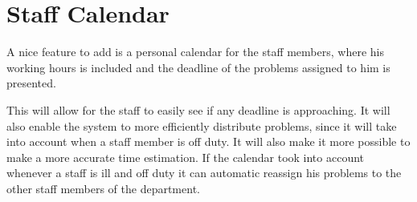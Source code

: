 \section{Staff Calendar}
\label{sec:staffCalendar}
A nice feature to add is a personal calendar for the staff members, where his working hours is included and the deadline of the problems assigned to him is presented. 

This will allow for the staff to easily see if any deadline is approaching. 
It will also enable the system to more efficiently distribute problems, since it will take into account when a staff member is off duty. It will also make it more possible to make a more accurate time estimation. 
If the calendar took into account whenever a staff is ill and off duty it can automatic reassign his problems to the other staff members of the department. 
